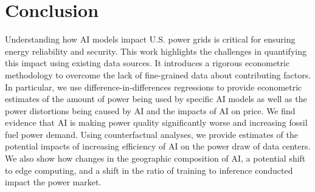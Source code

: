 \documentclass[sigconf,authordraft]{acmart}
\begin{document}




\section{Conclusion}
Understanding how AI models impact U.S. power grids is critical for ensuring energy reliability and security. This work highlights the challenges in quantifying this impact using existing data sources. It introduces a rigorous econometric methodology to overcome the lack of fine-grained data about contributing factors. In particular, we use difference-in-differences regressions to provide econometric estimates of the amount of power being used by specific AI models as well as the power distortions being caused by AI and the impacts of AI on price. We find evidence that AI is making power quality significantly worse and increasing fossil fuel power demand. Using counterfactual analyses, we provide estimates of the potential impacts of increasing efficiency of AI on the power draw of data centers. We also show how changes in the geographic composition of AI, a potential shift to edge computing, and a shift in the ratio of training to inference conducted impact the power market.
\end{document}
